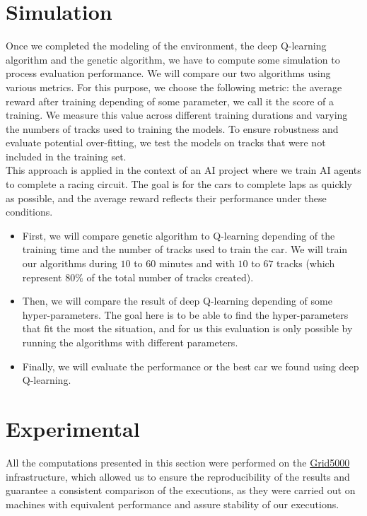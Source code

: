 \documentclass[11pt,a4paper]{article}
\newcommand{\mlist}[1]{\begin{itemize}[noitemsep,topsep=0pt]#1\end{itemize}}
\begin{document}
	
	\section*{Simulation}
Once we completed the modeling of the environment, the deep Q-learning algorithm and the genetic algorithm, we have to compute some simulation to process evaluation performance. We will compare our two algorithms using various metrics. For this purpose, we choose the following metric: the average reward after training depending of some parameter, we call it the score of a training. We measure this value across different training durations and varying the numbers of tracks used to training the models. To ensure robustness and evaluate potential over-fitting, we test the models on tracks that were not included in the training set.\\
This approach is applied in the context of an AI project where we train AI agents to complete a racing circuit. The goal is for the cars to complete laps as quickly as possible, and the average reward reflects their performance under these conditions.
\mlist{
\item First, we will compare genetic algorithm to Q-learning depending of the training time and the number of tracks used to train the car. We will train our algorithms during $10$ to $60$ minutes and with $10$ to $67$ tracks (which represent $80\%$ of the total number of tracks created).
\item Then, we will compare the result of deep Q-learning depending of some hyper-parameters. The goal here is to be able to find the hyper-parameters that fit the most the situation, and for us this evaluation is only possible by running the algorithms with different parameters.
\item Finally, we will evaluate the performance or the best car we found using deep Q-learning.
}

    \section*{Experimental}
All the computations presented in this section were performed on the \href{https://www.grid5000.fr}{Grid5000} infrastructure, which allowed us to ensure the reproducibility of the results and guarantee a consistent comparison of the executions, as they were carried out on machines with equivalent performance and assure stability of our executions.
\end{document}
